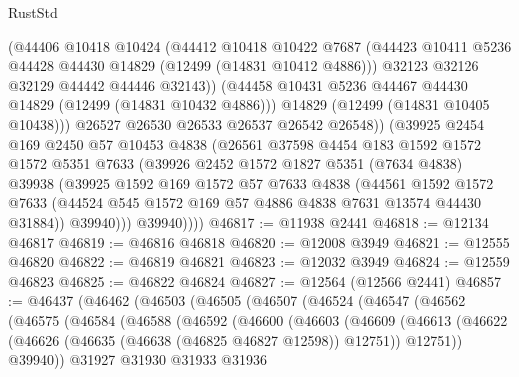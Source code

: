 \begin{lexlean}{RustStd}
\begin{coremodule}
                (@44406
                  @10418
                  @10424
                  (@44412
                    @10418
                    @10422
                    @7687
                    (@44423 @10411 @5236 @44428 @44430 @14829 (@12499 (@14831 @10412 @4886)))
                    @32123
                    @32126
                    @32129
                    @44442
                    @44446
                    @32143))
                (@44458 @10431 @5236 @44467 @44430 @14829 (@12499 (@14831 @10432 @4886)))
                @14829
                (@12499 (@14831 @10405 @10438)))
              @26527
              @26530
              @26533
              @26537
              @26542
              @26548))
          (@39925
            @2454
            @169
            @2450
            @57
            @10453
            @4838
            (@26561
              @37598
              @4454
              @183
              @1592
              @1572
              @1572
              @5351
              @7633
              (@39926
                @2452
                @1572
                @1827
                @5351
                (@7634 @4838)
                @39938
                (@39925
                  @1592
                  @169
                  @1572
                  @57
                  @7633
                  @4838
                  (@44561
                    @1592
                    @1572
                    @7633
                    (@44524 @545 @1572 @169 @57 @4886 @4838 @7631 @13574 @44430 @31884))
                  @39940)))
            @39940))))
@46817 := @11938 @2441
@46818 := @12134 @46817
@46819 := @46816 @46818
@46820 := @12008 @3949
@46821 := @12555 @46820
@46822 := @46819 @46821
@46823 := @12032 @3949
@46824 := @12559 @46823
@46825 := @46822 @46824
@46827 := @12564 (@12566 @2441)
@46857 := @46437
    (@46462
      (@46503
        (@46505
          (@46507
            (@46524
              (@46547
                (@46562
                  (@46575
                    (@46584
                      (@46588
                        (@46592
                          (@46600
                            (@46603
                              (@46609
                                (@46613
                                  (@46622
                                    (@46626 (@46635 (@46638 (@46825 @46827 @12598)) @12751))
                                    @12751))
                                @39940))
                            @31927
                            @31930
                            @31933
                            @31936

\end{coremodule}
\end{lexlean}
